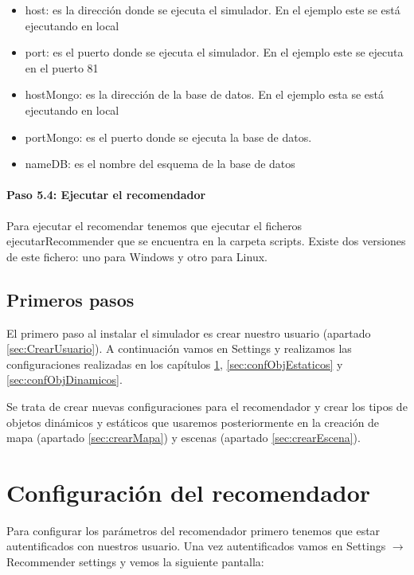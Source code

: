 \begin{itemize}
	\item host: es la dirección donde se ejecuta el simulador. En el ejemplo este se está ejecutando en local
	\item port: es el puerto donde se ejecuta el simulador. En el ejemplo este se ejecuta en el puerto 81
	\item hostMongo: es la dirección de la base de datos. En el ejemplo esta se está ejecutando en local
	\item portMongo: es el puerto donde se ejecuta la base de datos.
	\item nameDB: es el nombre del esquema de la base de datos
\end{itemize}

\paragraph{Paso 5.4: Ejecutar el recomendador}

Para ejecutar el recomendar tenemos que ejecutar el ficheros ejecutarRecommender que se encuentra en la carpeta scripts. Existe dos versiones de este fichero: uno para Windows y otro para Linux.

\subsection{Primeros pasos}

El primero paso al instalar el simulador es crear nuestro usuario (apartado \ref{sec:CrearUsuario}). A continuación vamos en Settings y realizamos las configuraciones realizadas en los capítulos \ref{sec:confRecomendador}, \ref{sec:confObjEstaticos} y \ref*{sec:confObjDinamicos}.

Se trata de crear nuevas configuraciones para el recomendador y crear los tipos de objetos dinámicos y estáticos que usaremos posteriormente en la creación de mapa (apartado \ref{sec:crearMapa}) y escenas (apartado \ref{sec:crearEscena}).

\section{Configuración del recomendador}\label{sec:confRecomendador}

Para configurar los parámetros del recomendador primero tenemos que estar autentificados con nuestros usuario. Una vez autentificados vamos en Settings $\rightarrow$ Recommender settings y vemos la siguiente pantalla:

